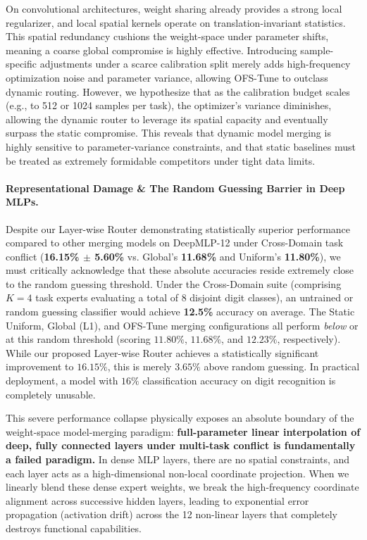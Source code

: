 \begin{itemize}
    On convolutional architectures, weight sharing already provides a strong local regularizer, and local spatial kernels operate on translation-invariant statistics. This spatial redundancy cushions the weight-space under parameter shifts, meaning a coarse global compromise is highly effective. Introducing sample-specific adjustments under a scarce calibration split merely adds high-frequency optimization noise and parameter variance, allowing OFS-Tune to outclass dynamic routing. However, we hypothesize that as the calibration budget scales (e.g., to 512 or 1024 samples per task), the optimizer's variance diminishes, allowing the dynamic router to leverage its spatial capacity and eventually surpass the static compromise. This reveals that dynamic model merging is highly sensitive to parameter-variance constraints, and that static baselines must be treated as extremely formidable competitors under tight data limits.
\end{itemize}

\paragraph{Representational Damage \& The Random Guessing Barrier in Deep MLPs.} Despite our Layer-wise Router demonstrating statistically superior performance compared to other merging models on DeepMLP-12 under Cross-Domain task conflict (\textbf{16.15\% $\pm$ 5.60\%} vs. Global's \textbf{11.68\%} and Uniform's \textbf{11.80\%}), we must critically acknowledge that these absolute accuracies reside extremely close to the random guessing threshold. Under the Cross-Domain suite (comprising $K=4$ task experts evaluating a total of 8 disjoint digit classes), an untrained or random guessing classifier would achieve \textbf{12.5\%} accuracy on average. 
The Static Uniform, Global (L1), and OFS-Tune merging configurations all perform \emph{below} or at this random threshold (scoring $11.80\%$, $11.68\%$, and $12.23\%$, respectively). While our proposed Layer-wise Router achieves a statistically significant improvement to $16.15\%$, this is merely $3.65\%$ above random guessing. In practical deployment, a model with $16\%$ classification accuracy on digit recognition is completely unusable.

This severe performance collapse physically exposes an absolute boundary of the weight-space model-merging paradigm: \textbf{full-parameter linear interpolation of deep, fully connected layers under multi-task conflict is fundamentally a failed paradigm.} In dense MLP layers, there are no spatial constraints, and each layer acts as a high-dimensional non-local coordinate projection. When we linearly blend these dense expert weights, we break the high-frequency coordinate alignment across successive hidden layers, leading to exponential error propagation (activation drift) across the 12 non-linear layers that completely destroys functional capabilities. 


